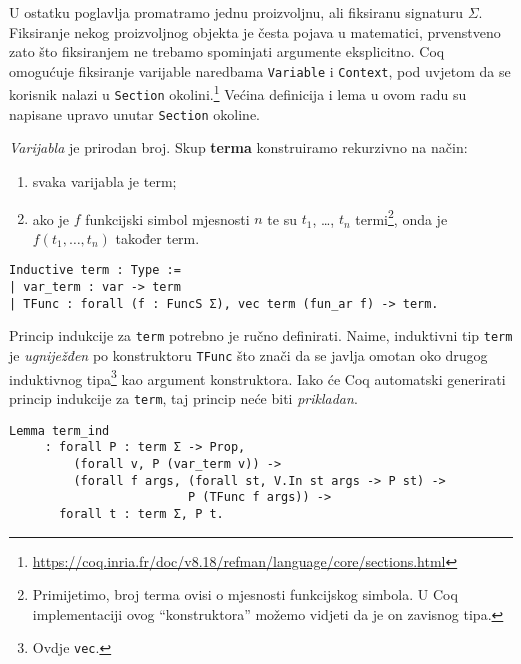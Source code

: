 
\noindent U ostatku poglavlja promatramo jednu proizvoljnu, ali fiksiranu signaturu \(\Sigma\).
Fiksiranje nekog proizvoljnog objekta je česta pojava u matematici,
prvenstveno zato što fiksiranjem ne trebamo spominjati argumente eksplicitno.
Coq omogućuje fiksiranje varijable naredbama \texttt{Variable} i \texttt{Context},
pod uvjetom da se korisnik nalazi u \texttt{Section} okolini.\footnote{\url{https://coq.inria.fr/doc/v8.18/refman/language/core/sections.html}}
Većina definicija i lema u ovom radu su napisane upravo unutar \texttt{Section} okoline.

\begin{definition}\label{def:term}
  \textit{Varijabla} je prirodan broj. Skup \textbf{terma} konstruiramo rekurzivno na način:
  \begin{enumerate}
  \item svaka varijabla je term;
  \item ako je \(f\) funkcijski simbol mjesnosti \(n\) te su \(t_{1}\), \ldots, \(t_{n}\) termi\footnote{Primijetimo, broj terma ovisi o mjesnosti funkcijskog simbola. U Coq implementaciji ovog ``konstruktora'' možemo vidjeti da je on zavisnog tipa.},
    onda je \(f(t_{1}, \ldots, t_{n})\) također term.
  \end{enumerate}
\begin{verbatim}
Inductive term : Type :=
| var_term : var -> term 
| TFunc : forall (f : FuncS Σ), vec term (fun_ar f) -> term.
\end{verbatim}
\end{definition}

Princip indukcije za \texttt{term} potrebno je ručno definirati.
Naime, induktivni tip \texttt{term} je \textit{ugniježđen} po konstruktoru \texttt{TFunc} što znači da se
javlja omotan oko drugog induktivnog tipa\footnote{Ovdje \texttt{vec}.} kao argument konstruktora.
Iako će Coq automatski generirati princip indukcije za \texttt{term}, taj princip neće biti \textit{prikladan}.
\begin{verbatim}
Lemma term_ind
     : forall P : term Σ -> Prop,
         (forall v, P (var_term v)) ->
         (forall f args, (forall st, V.In st args -> P st) ->
                         P (TFunc f args)) ->
       forall t : term Σ, P t.
\end{verbatim}

